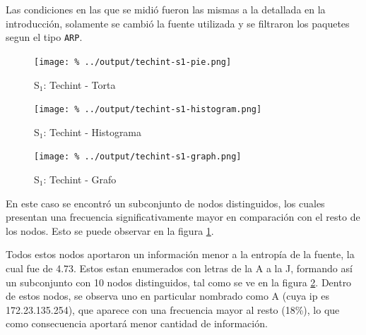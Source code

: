 \documentclass[final,inline,a4paper,narroweqnarray]{ieee}
\begin{document}
  Las condiciones en las que se midió fueron las mismas a la detallada
  en la introducción, solamente se cambió la fuente utilizada y se
  filtraron los paquetes segun el tipo \texttt{ARP}.

    \begin{figure}[ht]\begin{center}
      \texttt{[image: \%
      ../output/techint-s1-pie.png]}
      \vspace{-2em}
      \caption{S$_1$: Techint - Torta}
      \label{techint-s1-pie}
    \end{center}\end{figure}

    \begin{figure}[ht]\begin{center}
      \texttt{[image: \%
      ../output/techint-s1-histogram.png]}
      \vspace{-2em}
      \caption{S$_1$: Techint - Histograma}
      \label{techint-s1-histogram}
    \end{center}\end{figure}

    \begin{figure}[ht]\begin{center}
      \texttt{[image: \%
      ../output/techint-s1-graph.png]}
      \vspace{-2em}
      \caption{S$_1$: Techint - Grafo}
      \label{techint-s1-graph}
    \end{center}\end{figure}


  En este caso se encontró un subconjunto de nodos distinguidos, los
  cuales presentan una frecuencia significativamente mayor en
  comparación con el resto de los nodos. Esto se puede observar en la
  figura \ref{techint-s1-pie}.

  Todos estos nodos aportaron un información menor a la entropía de la
  fuente, la cual fue de 4.73. Estos estan enumerados con letras de la A a
  la J, formando así un subconjunto con 10 nodos distinguidos, tal como se
  ve en la figura \ref{techint-s1-histogram}. Dentro de estos nodos, se
  observa uno en particular nombrado como A (cuya ip es 172.23.135.254), que
  aparece con una frecuencia mayor al resto (18\%), lo que como consecuencia
  aportará menor cantidad de información.
\end{document}
